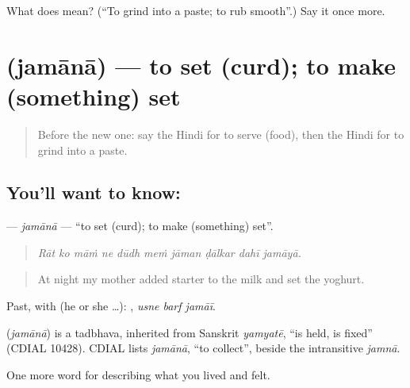 \begin{tcolorbox}[breakable,colback=teal!4,colframe=teal!35!black,title={Before you move on}]
What does  mean? (\textquotedblleft{}To grind into a paste; to rub smooth\textquotedblright{}.) Say it once more.
\end{tcolorbox}
\section[\texorpdfstring{\hi{जमाना} (jamānā)}{जमाना (jamānā)}]{ (jamānā) — to set (curd); to make (something) set}

\label{lesson:HI-C524-jamana}



\begin{quote}
Before the new one: say the Hindi for to serve (food), then the Hindi for to grind into a paste.
\end{quote}

\subsection*{You'll want to know: }
\textbf{} — \emph{jamānā} — \textquotedblleft{}to set (curd); to make (something) set\textquotedblright{}.

\begin{quote}
         
\end{quote}

\begin{quote}
\emph{Rāt ko māṁ ne dūdh meṁ jāman ḍālkar dahī jamāyā.}
\end{quote}

\begin{quote}
At night my mother added starter to the milk and set the yoghurt.
\end{quote}

Past, with  (he or she …):   , \emph{usne barf jamāī}.

\begin{cousinweb}
\textbf{} (\emph{jamānā}) is a tadbhava, inherited from Sanskrit \emph{yamyatē}, \textquotedblleft{}is held, is fixed\textquotedblright{} (CDIAL 10428). CDIAL lists \emph{jamānā}, \textquotedblleft{}to collect\textquotedblright{}, beside the intransitive \emph{jamnā}.
\end{cousinweb}

\begin{grammarlens}[title={What you've built}]
One more word for describing what you lived and felt.
\end{grammarlens}

